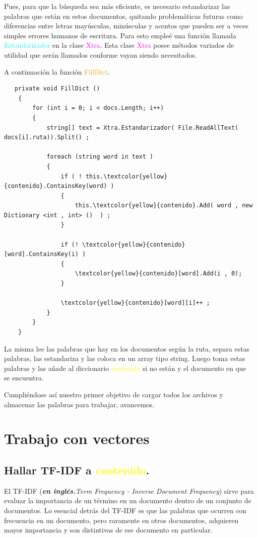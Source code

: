 \documentclass{article}
\begin{document}
Pues, para que la búsqueda sea más eficiente, es necesario estandarizar las palabras que están en estos documentos, quitando problemáticas futuras como diferencias entre letras mayúsculas, minúsculas y acentos que pueden ser a veces simples errores humanos de escritura. Para esto empleé una función llamada \textcolor{cyan}{Estandarizador} en la clase \textcolor{magenta}{Xtra}.
Esta clase \textcolor{magenta}{Xtra} posee métodos variados de utilidad que serán llamados conforme vayan siendo necesitados.

A continuación la función \textcolor{orange}{FillDict}.

\begin{lstlisting}
   private void FillDict ()
    {
        for (int i = 0; i < docs.Length; i++)
        {
            string[] text = Xtra.Estandarizador( File.ReadAllText( docs[i].ruta)).Split() ;
                
            foreach (string word in text )
            {
                if ( ! this.\textcolor{yellow}{contenido}.ContainsKey(word) )
                {
                    this.\textcolor{yellow}{contenido}.Add( word , new Dictionary <int , int> ()  ) ;
                }
                
                if (! \textcolor{yellow}{contenido}[word].ContainsKey(i) )
                {
                    \textcolor{yellow}{contenido}[word].Add(i , 0);
                }
                
                \textcolor{yellow}{contenido}[word][i]++ ;
            }
        }
    }

\end{lstlisting}


La misma lee las palabras que hay en los documentos según la ruta, separa estas palabras, las estandariza y las coloca en un array tipo string. Luego toma estas palabras y las añade al
diccionario \textcolor{yellow!80!black}{\textcolor{yellow}{contenido}} si no están y el documento en que se encuentra.

Cumpliéndose así nuestro primer objetivo de cargar todos los archivos y almacenar las palabras para trabajar, avancemos.

\section{Trabajo con vectores}
\subsection{Hallar TF-IDF a \textcolor{yellow}{contenido}.}
El TF-IDF (\emph{\textbf{en inglés.}Term Frequency - Inverse Document Frequency}) sirve para evaluar la importancia de un término en un documento dentro de un conjunto de documentos.
Lo esencial detrás del TF-IDF es que las palabras que ocurren con frecuencia en un documento, pero raramente en otros documentos, adquieren mayor importancia y son distintivas de ese documento en particular.\\
\end{document}
